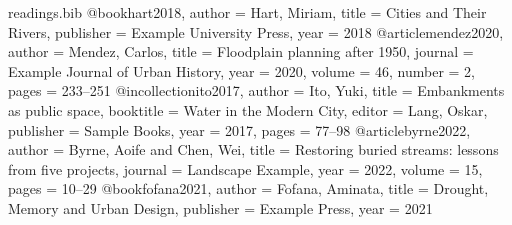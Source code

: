 \begin{filecontents*}[overwrite]{readings.bib}
@book{hart2018,
  author    = {Hart, Miriam},
  title     = {Cities and Their Rivers},
  publisher = {Example University Press},
  year      = {2018}
}
@article{mendez2020,
  author  = {Mendez, Carlos},
  title   = {Floodplain planning after 1950},
  journal = {Example Journal of Urban History},
  year    = {2020},
  volume  = {46},
  number  = {2},
  pages   = {233--251}
}
@incollection{ito2017,
  author    = {Ito, Yuki},
  title     = {Embankments as public space},
  booktitle = {Water in the Modern City},
  editor    = {Lang, Oskar},
  publisher = {Sample Books},
  year      = {2017},
  pages     = {77--98}
}
@article{byrne2022,
  author  = {Byrne, Aoife and Chen, Wei},
  title   = {Restoring buried streams: lessons from five projects},
  journal = {Landscape Example},
  year    = {2022},
  volume  = {15},
  pages   = {10--29}
}
@book{fofana2021,
  author    = {Fofana, Aminata},
  title     = {Drought, Memory and Urban Design},
  publisher = {Example Press},
  year      = {2021}
}
\end{filecontents*}
\documentclass[11pt,a4paper]{article}
\usepackage[a4paper,margin=2.2cm]{geometry}
\usepackage[authoryear,round]{natbib}
\usepackage{xcolor}
\usepackage{tabularx}
\usepackage{booktabs}
\usepackage{enumitem}
\usepackage{titlesec}
\usepackage{microtype}
\usepackage[hidelinks]{hyperref}

\setlength{\parindent}{0pt}
\setlength{\parskip}{0.5ex}

\titleformat{\section}{\normalfont\Large\bfseries\color{week}}{}{0pt}{}

\newcommand{\core}{\textsf{\small\colorbox{week}{\textcolor{white}{CORE}}}}
\newcommand{\optional}{\textsf{\small\colorbox{week!15}{\textcolor{week}{OPTIONAL}}}}

\newcommand{\weekrow}[4]{\textbf{#1} & #2 & #3 & #4 \\ \midrule}



{\small\color{week}\textsf{GEOG 2140 \textbullet\ Autumn 2026}\par}
{\LARGE\bfseries Rivers and the Modern City\par}
{\large Reading list and schedule\par}
\medskip
Convenor: Dr Convenor Name \quad Office hours: Tuesdays 14:00 to 16:00 \quad Room: B2.07


